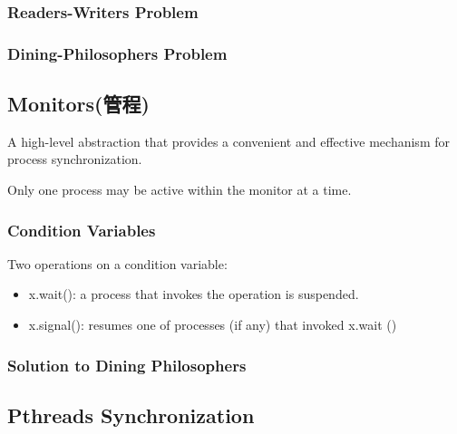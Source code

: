 \subsubsection{Readers-Writers Problem}

\subsubsection{Dining-Philosophers Problem}

\subsection{Monitors(管程)}
A high-level abstraction that provides a convenient and effective mechanism for process synchronization. 

Only one process may be active within the monitor at a time. 


\subsubsection{Condition Variables}

Two operations on a condition variable:
\begin{itemize}
    \item x.wait(): a process that invokes the operation is suspended.
    \item x.signal(): resumes one of processes (if any) that invoked x.wait ()
\end{itemize}


\subsubsection{Solution to Dining Philosophers}


\subsection{Pthreads Synchronization}

